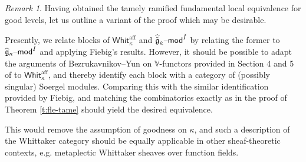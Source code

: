 \documentclass[11pt,reqno]{amsart}
\newcommand{\cgk}{\widehat{\check{\mathfrak{g}}}_{\check{\kappa}}}
\newcommand{\aff}{\operatorname{aff}}
\newcommand{\g}{\widehat{\mathfrak{g}}}
\newcommand{\fL}{\mathfrak{L}}
\newcommand{\gk}{\g_\kappa}
\theoremstyle{remark}
\newtheorem{re}[subsubsection]{Remark}
\numberwithin{equation}{section}
\newcommand{\ck}{\check{\kappa}}
\renewcommand{\mod}{\text{\textendash}\mathsf{mod}}
\newcommand{\Whit}{\mathsf{Whit}}
\begin{document}
 \begin{re} \label{r:Soergelmethods}Having obtained the tamely ramified 
 fundamental local equivalence 
 for 
 good levels, let us outline a variant of the proof which may be 
 desirable.
 
 Presently, we relate blocks of $\Whit_\kappa^{\aff}$ and 
 $\cgk\mod^{\check{I}}$ by relating the former to $\gk\mod^{I}$ and applying 
 Fiebig's results. However, it should be possible to adapt the arguments of 
 Bezrukavnikov--Yun on $\mathbb{V}$-functors provided in Section 4 and 5 of 
 \cite{by} 
 to $\Whit_{\kappa}^{\aff}$, and thereby identify each block with a category of 
 (possibly singular) Soergel modules. Comparing this with the similar 
 identification provided by 
 Fiebig, and matching the combinatorics exactly as in the proof of Theorem 
 \ref{t:fle-tame} should yield the desired equivalence. 
 
 This would remove the assumption of 
 goodness on $\kappa$, and such a description of the Whittaker 
 category should be equally applicable in other sheaf-theoretic contexts, e.g. 
 metaplectic Whittaker sheaves over function 
 fields.
 
 

\end{re}
\end{document}
